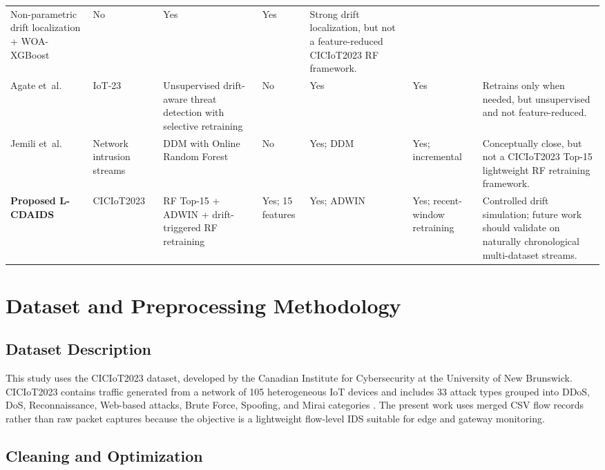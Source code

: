 \documentclass[11pt,a4paper]{article}
\begin{document}
\begin{table}
\begin{tabular}{p{2.5cm} p{2.2cm} p{3.4cm} p{1.9cm} p{1.4cm} p{2.2cm} p{4.6cm}}
Non-parametric drift localization + WOA-XGBoost & No & Yes & Yes &
Strong drift localization, but not a feature-reduced CICIoT2023 RF
framework. \\
\addlinespace
Agate et~al.\ \cite{agate2024} & IoT-23 &
Unsupervised drift-aware threat detection with selective retraining &
No & Yes & Yes &
Retrains only when needed, but unsupervised and not feature-reduced. \\
\addlinespace
Jemili et~al.\ \cite{jemili2025} & Network intrusion streams &
DDM with Online Random Forest & No & Yes; DDM & Yes; incremental &
Conceptually close, but not a CICIoT2023 Top-15 lightweight RF
retraining framework. \\
\addlinespace
\textbf{Proposed L-CDAIDS} & CICIoT2023 &
RF Top-15 + ADWIN + drift-triggered RF retraining &
Yes; 15 features & Yes; ADWIN & Yes; recent-window retraining &
Controlled drift simulation; future work should validate on naturally
chronological multi-dataset streams. \\
\bottomrule
\end{tabular}
\end{table}

\section{Dataset and Preprocessing Methodology}
\label{sec:dataset}

\subsection{Dataset Description}

This study uses the CICIoT2023 dataset, developed by the Canadian
Institute for Cybersecurity at the University of New Brunswick.
CICIoT2023 contains traffic generated from a network of 105
heterogeneous IoT devices and includes 33 attack types grouped into
DDoS, DoS, Reconnaissance, Web-based attacks, Brute Force, Spoofing, and
Mirai categories \cite{neto2023}. The present work uses merged CSV flow
records rather than raw packet captures because the objective is a
lightweight flow-level IDS suitable for edge and gateway monitoring.

\subsection{Cleaning and Optimization}
\end{document}
